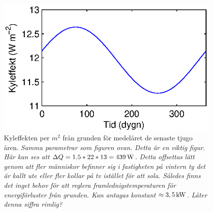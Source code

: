 \begin{figure}
\centering
\includegraphics{images/groundcool.eps}
\caption{Kyleffekten per $m^2$ från grunden för medelåret de senaste tjugo åren. \emph{\color{red} Samma parametrar som figuren ovan.}\emph{\color{red}                                     
Detta är en viktig figur. Här kan ses att $\Delta Q = 1.5*22*13 = \unit[439]{W}$. Detta offsettas lätt genom att fler
människor befinner sig i fastigheten på vintern ty det är kallt ute eller fler kollar på tv istället för att sola.
Således finns det inget behov för att reglera framlednigstemperaturen för energiförluster från grunden. Kan antagas konstant
$\approx \unit[3,5]{kW}$. Låter denna siffra rimlig?}}

\end{figure}

